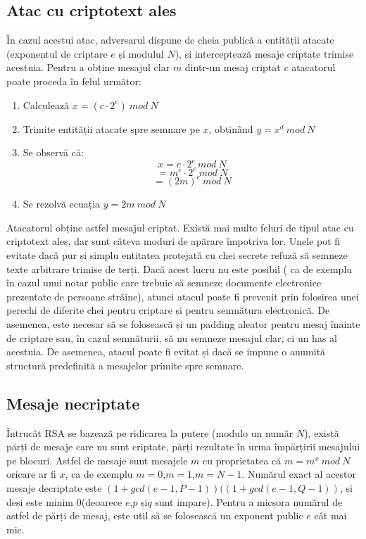 \documentclass[12pt, oneside]{book}
\begin{document}
\subsection{Atac cu criptotext ales}
În cazul acestui atac, adversarul dispune de cheia publică a entității atacate (exponentul de criptare $e$ și modulul $N$), și interceptează mesaje criptate trimise acestuia. Pentru a obține mesajul clar $m$ dintr-un mesaj criptat $c$ atacatorul poate proceda în felul următor:
\begin{enumerate}
\item Calculează $x=(c \cdot   2^e) \ mod \ N$
\item Trimite entității atacate spre semnare pe $x$, obținând $y=x^d \ mod \ N$
\item Se observă că: 
$$x=c \cdot 2^e \ mod \ N $$
$$=m^e \cdot   2^e \ mod \ N$$
$$=(2m)^e \ mod \ N$$ 
\item Se rezolvă ecuația $y=2m \ mod \ N$
\end{enumerate}
Atacatorul obține astfel mesajul criptat. Există mai multe feluri de tipul atac cu criptotext ales, dar sunt câteva moduri de apărare împotriva lor. Unele pot fi evitate dacă pur și simplu entitatea protejată cu chei secrete refuză să semneze texte arbitrare trimise de terți. Dacă acest lucru nu este posibil ( ca de exemplu în cazul unui notar public care trebuie să semneze documente electronice prezentate de persoane străine), atunci atacul poate fi prevenit prin folosirea unei perechi de diferite chei pentru criptare și pentru semnătura electronică. De asemenea, este necesar să se folosească și un padding aleator pentru mesaj înainte de criptare sau, în cazul semnăturii, să nu semneze mesajul clar, ci un has al acestuia. De asemenea, atacul poate fi evitat și dacă se impune o anumită structură predefinită a mesajelor primite spre semnare.
\subsection{Mesaje necriptate}
Întrucât RSA se bazează pe ridicarea la putere (modulo un număr $N$), există părți de mesaje care nu sunt criptate, părți rezultate în urma împărțirii mesajului pe blocuri. Astfel de mesaje sunt mesajele $m$ cu proprietatea că $m=m^x \ mod \ N$ oricare ar fi $x$, ca de exemplu $m=0$,$m=1$,$m=N-1$. Numărul exact al acestor mesaje decriptate este $(1+gcd(e-1,P-1))((1+gcd(e-1,Q-1))$, și deși este minim 0(deoarece $e$,$p$ și$q$ sunt impare). Pentru a micșora numărul de astfel de părți de mesaj, este util să se folosească un exponent public $e$ cât mai mic.
\end{document}
